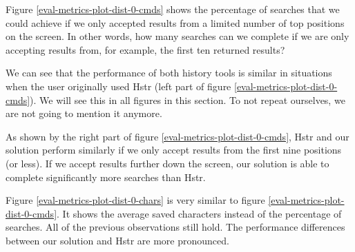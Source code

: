 Figure \ref{eval-metrics-plot-dist-0-cmds} shows the percentage of searches that we could achieve if we only accepted results from a limited number of top positions on the screen. In other words, how many searches can we complete if we are only accepting results from, for example, the first ten returned results?

We can see that the performance of both history tools is similar in situations when the user originally used Hstr (left part of figure \ref{eval-metrics-plot-dist-0-cmds}). We will see this in all figures in this section. To not repeat ourselves, we are not going to mention it anymore.

As shown by the right part of figure \ref{eval-metrics-plot-dist-0-cmds}, Hstr and our solution perform similarly if we only accept results from the first nine positions (or less). If we accept results further down the screen, our solution is able to complete significantly more searches than Hstr.


Figure \ref{eval-metrics-plot-dist-0-chars} is very similar to figure \ref{eval-metrics-plot-dist-0-cmds}. It shows the average saved characters instead of the percentage of searches. All of the previous observations still hold. The performance differences between our solution and Hstr are more pronounced. 


